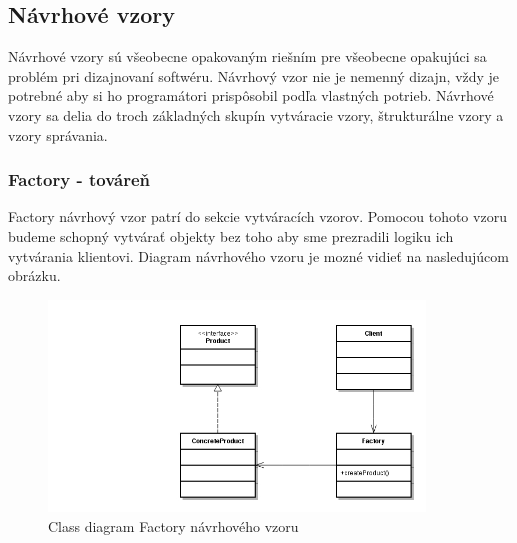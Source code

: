 {\subsection{Návrhové vzory}
\indent Návrhové vzory sú všeobecne opakovaným riešním pre všeobecne opakujúci sa problém pri dizajnovaní softwéru. Návrhový vzor nie je nemenný dizajn, vždy je potrebné aby si ho programátori prispôsobil podľa vlastných potrieb. Návrhové vzory sa delia do troch základných skupín vytváracie vzory, štrukturálne vzory a vzory správania. \cite{designpattern}

\subsubsection{Factory - továreň}
\indent Factory návrhový vzor patrí do sekcie vytváracích vzorov. Pomocou tohoto vzoru budeme schopný vytvárať objekty bez toho aby sme prezradili logiku ich vytvárania klientovi.\cite{designpattern}
Diagram návrhového vzoru je mozné vidieť na nasledujúcom obrázku.
\begin{figure}[H]
	\centering
	\includegraphics[width=10cm]{img/factory_design_pattern.jpg}
	\caption{Class diagram Factory návrhového vzoru}
	\label{fig:test}
\end{figure}

}
